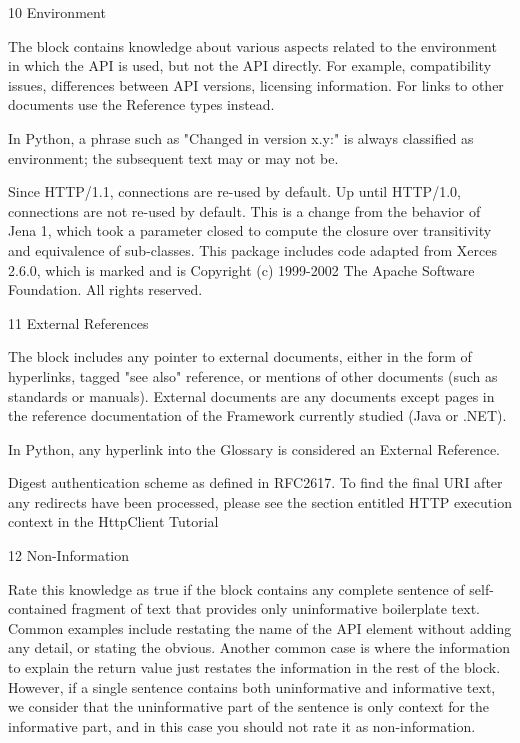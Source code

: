 10 Environment

The block contains knowledge about various aspects related to the environment in which the API is used, but not the API directly. For example, compatibility issues, differences between API versions, licensing information. For links to other documents use the Reference types instead.

In Python, a phrase such as "Changed in version x.y:" is always classified as environment; the subsequent text may or may not be.

Since HTTP/1.1, connections are re-used by default. Up until HTTP/1.0, connections are not re-used by default.
This is a change from the behavior of Jena 1, which took a parameter closed to compute the closure over transitivity and equivalence of sub-classes.
This package includes code adapted from Xerces 2.6.0, which is marked and is Copyright (c) 1999-2002 The Apache Software Foundation. All rights reserved.
 

11 External References

The block includes any pointer to external documents, either in the form of hyperlinks, tagged "see also" reference, or mentions of other documents (such as standards or manuals). External documents are any documents except pages in the reference documentation of the Framework currently studied (Java or .NET).

In Python, any hyperlink into the Glossary is considered an External Reference.

Digest authentication scheme as defined in RFC2617.
To find the final URI after any redirects have been processed, please see the section entitled HTTP execution context in the HttpClient Tutorial
 

12 Non-Information

Rate this knowledge as true if the block contains any complete sentence of self-contained fragment of text that provides only uninformative boilerplate text. Common examples include restating the name of the API element without adding any detail, or stating the obvious. Another common case is where the information to explain the return value just restates the information in the rest of the block. However, if a single sentence contains both uninformative and informative text, we consider that the uninformative part of the sentence is only context for the informative part, and in this case you should not rate it as non-information.

